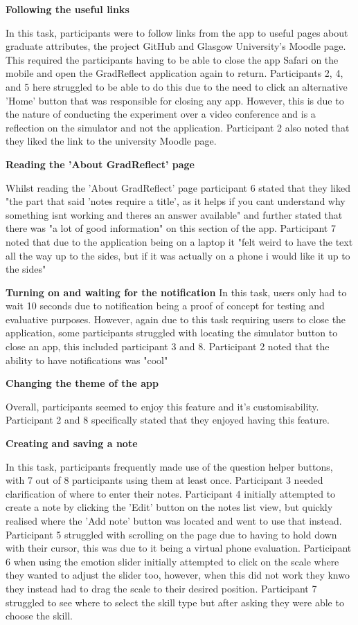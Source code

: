 \documentclass{l4proj}
\begin{document}
\textbf{Following the useful links}
\par
In this task, participants were to follow links from the app to useful pages about graduate attributes, the project
GitHub and Glasgow University's Moodle page. This required the participants having to be able to close the app Safari
on the mobile and open the GradReflect application again to return. Participants 2, 4, and 5 here struggled to be able
to do this due to the need to click an alternative 'Home' button that was responsible for closing any app. However, this
is due to the nature of conducting the experiment over a video conference and is a reflection on the simulator and 
not the application. Participant 2 also noted that they liked the link to the university Moodle page.

\textbf{Reading the 'About GradReflect' page}
\par
Whilst reading the 'About GradReflect' page participant 6 stated that they liked "the part that said 
'notes require a title', as it helps if you cant understand why something isnt working and theres an answer available" and
further stated that there was "a lot of good information" on this section of the app. Participant 7 noted that due to the 
application being on a laptop it "felt weird to have the text all the way up to the sides, but if it was actually on
a phone i would like it up to the sides"

\textbf{Turning on and waiting for the notification}
In this task, users only had to wait 10 seconds due to notification being a proof of concept for testing and evaluative
purposes. However, again due to this task requiring users to close the application, some participants struggled with 
locating the simulator button to close an app, this included participant 3 and 8. Participant 2 noted that the ability to
have notifications was "cool"

\textbf{Changing the theme of the app}
\par 
Overall, participants seemed to enjoy this feature and it's customisability. Participant 2 and 8 specifically stated that 
they enjoyed having this feature.

\textbf{Creating and saving a note}
\par 
In this task, participants frequently made use of the question helper buttons, with 7 out of 8 participants using them
at least once. Participant 3 needed clarification of where to enter their notes. Participant 4 initially attempted
to create a note by clicking the 'Edit' button on the notes list view, but quickly realised where the 'Add note' button
was located and went to use that instead. Participant 5 struggled with scrolling on the page due to having to hold
down with their cursor, this was due to it being a virtual phone evaluation. Participant 6 when using the emotion
slider initially attempted to click on the scale where they wanted to adjust the slider too, however, when this did not 
work they knwo they instead had to drag the scale to their desired position. Participant 7 struggled to see where
to select the skill type but after asking they were able to choose the skill.
\end{document}
